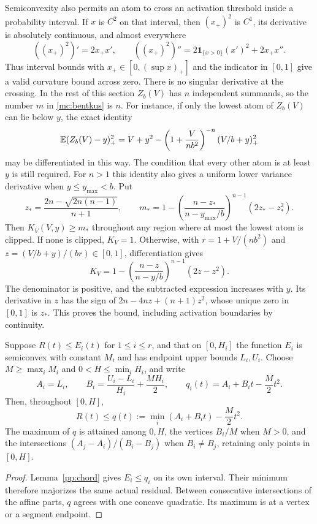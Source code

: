 Semiconvexity also permits an atom to cross an activation threshold
inside a probability interval. If $x$ is $C^2$ on that interval,
then $(x_+)^2$ is $C^1$, its derivative is absolutely continuous,
and almost everywhere
\begin{equation}\label{pp:activation-curvature}
 ((x_+)^2)'=2x_+x',\qquad
 ((x_+)^2)''=2\mathbf1_{\{x>0\}}(x')^2+2x_+x''.
\end{equation}
Thus interval bounds with $x_+\in[0,(\sup x)_+]$ and the indicator
in $[0,1]$ give a valid curvature bound across zero.
There is no singular derivative at the crossing. In the rest of this
section $Z_b(V)$ has $n$ independent summands, so the number $m$
in \eqref{mc:bentkus} is $n$. For instance, if
only the lowest atom of $Z_b(V)$ can lie below $y$, the exact identity
\begin{equation}\label{pp:one-clip}
 \mathbb E(Z_b(V)-y)_+^2
 =V+y^2-\left(1+\frac{V}{nb^2}\right)^{-n}(V/b+y)_+^2
\end{equation}
may be differentiated in this way. The condition that every other
atom is at least $y$ is still required.
For $n>1$ this identity also gives a uniform lower variance derivative
when $y\le y_{\max}<b$. Put
\[
 z_* =\frac{2n-\sqrt{2n(n-1)}}{n+1},\qquad
 m_* =1-\left(\frac{n-z_*}{n-y_{\max}/b}\right)^{n-1}
                         (2z_*-z_*^2).
\]
Then $K_V(V,y)\ge m_*$ throughout any region where at most the
lowest atom is clipped. If none is clipped, $K_V=1$.
Otherwise, with $r=1+V/(nb^2)$ and
$z=(V/b+y)/(br)\in[0,1]$, differentiation gives
\[
 K_V=1-\left(\frac{n-z}{n-y/b}\right)^{n-1}(2z-z^2).
\]
The denominator is positive, and the subtracted expression increases
with $y$. Its derivative in
$z$ has the sign of $2n-4nz+(n+1)z^2$, whose unique zero in
$[0,1]$ is $z_*$. This proves the bound, including activation
boundaries by continuity.

\begin{lemma}\label{pp:mixture}
Suppose $R(t)\le E_i(t)$ for $1\le i\le r$, and that on $[0,H_i]$
the function $E_i$ is semiconvex with constant $M_i$ and has
endpoint upper bounds $L_i,U_i$. Choose
$M\ge\max_i M_i$ and $0<H\le\min_i H_i$, and write
\[
 A_i=L_i,\qquad B_i=\frac{U_i-L_i}{H_i}+\frac{MH_i}{2},
 \qquad q_i(t)=A_i+B_it-\frac M2t^2.
\]
Then, throughout $[0,H]$,
\begin{equation}\label{pp:mixed-bound}
 R(t)\le q(t):=\min_i(A_i+B_it)-\frac M2t^2.
\end{equation}
The maximum of $q$ is attained among $0,H$, the vertices $B_i/M$
when $M>0$, and the intersections $(A_j-A_i)/(B_i-B_j)$ when
$B_i\ne B_j$, retaining only points in $[0,H]$.
\end{lemma}
\begin{proof}
Lemma~\ref{pp:chord} gives $E_i\le q_i$ on its own interval.
Their minimum therefore majorizes the same actual residual. Between
consecutive intersections of the affine parts, $q$ agrees with one
concave quadratic. Its maximum is at a vertex or a segment endpoint.
\end{proof}

